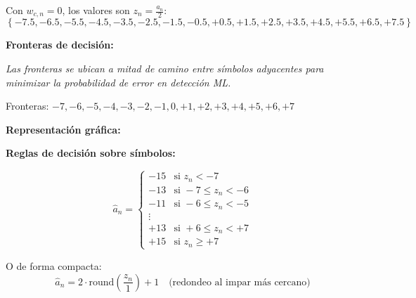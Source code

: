 \documentclass[11pt,a4paper]{article}
\begin{document}
Con $w_{c,n} = 0$, los valores son $z_n = \frac{a_n}{2}$:
\[
\left\{-7.5, -6.5, -5.5, -4.5, -3.5, -2.5, -1.5, -0.5, +0.5, +1.5, +2.5, +3.5, +4.5, +5.5, +6.5, +7.5\right\}
\]

\textbf{Fronteras de decisi\'on:}

\textit{Las fronteras se ubican a mitad de camino entre s\'imbolos adyacentes para minimizar la probabilidad de error en detecci\'on ML.}

Fronteras: $-7, -6, -5, -4, -3, -2, -1, 0, +1, +2, +3, +4, +5, +6, +7$

\textbf{Representaci\'on gr\'afica:}

\begin{center}
\end{center}

\textbf{Reglas de decisi\'on sobre s\'imbolos:}

\[
\hat{a}_n = \begin{cases}
-15 & \text{si } z_n < -7 \\
-13 & \text{si } -7 \leq z_n < -6 \\
-11 & \text{si } -6 \leq z_n < -5 \\
\vdots \\
+13 & \text{si } +6 \leq z_n < +7 \\
+15 & \text{si } z_n \geq +7
\end{cases}
\]

O de forma compacta:
\[
\hat{a}_n = 2 \cdot \text{round}\left(\frac{z_n}{1}\right) + 1 \quad \text{(redondeo al impar m\'as cercano)}
\]
\end{document}
